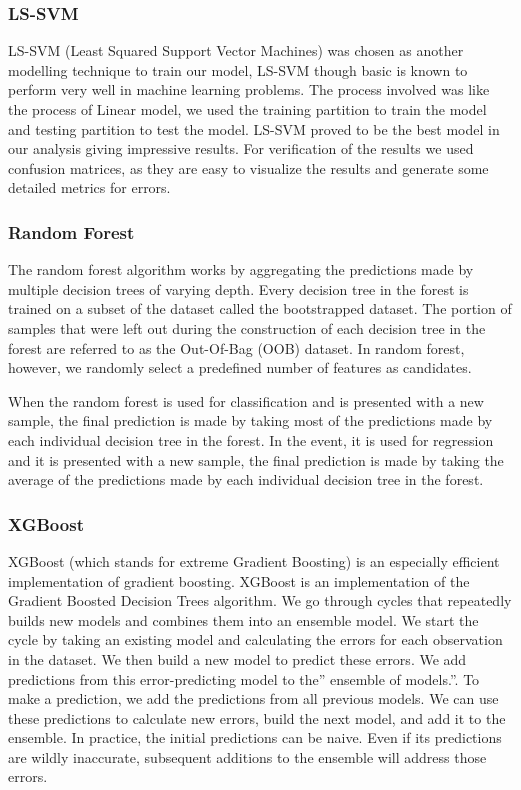 \documentclass[11pt]{article}
\begin{document}
\begin{multicols}{2}
    \subsubsection{LS-SVM}
    LS-SVM (Least Squared Support Vector Machines) was chosen as another modelling technique to train our model, LS-SVM though basic is known to perform very well in machine learning problems. The process involved was like the process of Linear model, we used the training partition to train the model and testing partition to test the model. LS-SVM proved to be the best model in our analysis giving impressive results. For verification of the results we used confusion matrices, as they are easy to visualize the results and generate some detailed metrics for errors.

    \subsubsection{Random Forest }
    The random forest algorithm \cite{rfr} works by aggregating the predictions made by multiple decision trees of varying depth. Every decision tree in the forest is trained on a subset of the dataset called the bootstrapped dataset. The portion of samples that were left out during the construction of each decision tree in the forest are referred to as the Out-Of-Bag (OOB) dataset. In random forest, however, we randomly select a predefined number of features as candidates. 

    When the random forest is used for classification and is presented with a new sample, the final prediction is made by taking most of the predictions made by each individual decision tree in the forest. In the event, it is used for regression and it is presented with a new sample, the final prediction is made by taking the average of the predictions made by each individual decision tree in the forest. 

    \subsubsection{XGBoost }
    XGBoost (which stands for extreme Gradient Boosting) \cite{mlxgb} is an especially efficient implementation of gradient boosting. XGBoost is an implementation of the Gradient Boosted Decision Trees algorithm. We go through cycles that repeatedly builds new models and combines them into an ensemble model. We start the cycle by taking an existing model and calculating the errors for each observation in the dataset. We then build a new model to predict these errors. We add predictions from this error-predicting model to the” ensemble of models.”. To make a prediction, we add the predictions from all previous models. We can use these predictions to calculate new errors, build the next model, and add it to the ensemble. In practice, the initial predictions can be naive. Even if its predictions are wildly inaccurate, subsequent additions to the ensemble will address those errors. \newline


\end{multicols}
\end{document}
